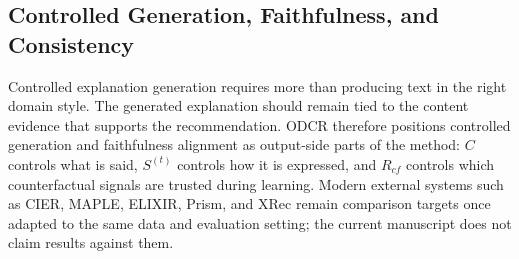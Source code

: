 \subsection{Controlled Generation, Faithfulness, and Consistency}

Controlled explanation generation requires more than producing text in the
right domain style. The generated explanation should remain tied to the
content evidence that supports the recommendation. ODCR therefore positions
controlled generation and faithfulness alignment as output-side parts of the
method: \(C\) controls what is said, \(S^{(t)}\) controls how it is expressed,
and \(R_{cf}\) controls which counterfactual signals are trusted during
learning. Modern external systems such as CIER, MAPLE, ELIXIR, Prism, and XRec
remain comparison targets once adapted to the same data and evaluation setting;
the current manuscript does not claim results against them.

